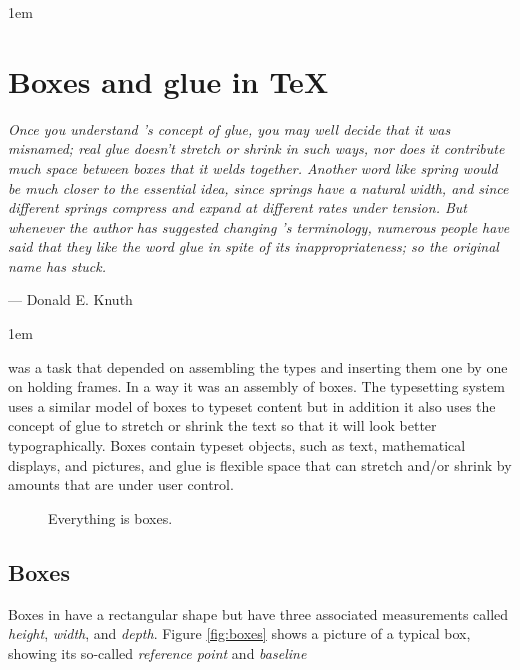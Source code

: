 \parindent1em

\chapter{Boxes and glue in TeX}

\setlength{\columnsep}{2em}
{\it Once you understand \tex\rq{}s concept of glue, you may well decide that
it was misnamed; real glue doesn't stretch or shrink in such ways, nor does it
contribute much space between boxes that it welds together. Another word like
\emph{spring} would be much closer to the essential idea, since springs have a natural
width, and since different springs compress and expand at different rates
under tension. But whenever the author has suggested changing \tex's terminology,
numerous people have said that they like the word \emph{glue} in spite of its
inappropriateness; so the original name has stuck. }
\smallskip

{\hfill  ---  Donald E. Knuth}

\medskip   


\parindent1em




 was a task that depended on assembling the types and inserting them one by one on holding frames. In a way it was an assembly of boxes.
The \tex typesetting system uses a similar model of boxes to typeset content but in addition it also uses the concept of glue to stretch or shrink the text so that it will look better typographically. Boxes contain
typeset objects, such as text, mathematical displays, and pictures, and glue
is flexible space that can stretch and/or shrink by amounts that are under
user control.

\begin{figure}[h]
\centering
\hbox{}
\caption{Everything is boxes.}
\end{figure}

\printfontparams

\section*{Boxes}

Boxes in \tex have  a rectangular shape but have
three associated measurements called \emph{height}, \emph{width}, and \emph{depth}.
Figure \ref{fig:boxes} shows a 
picture of a typical box, showing its so-called \emph{reference point} and \emph{baseline}

